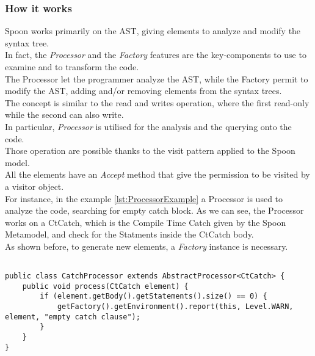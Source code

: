 \subsubsection{How it works}\label{subsec:howSpoon}
Spoon works primarily on the AST, giving elements to analyze and modify the syntax tree.\\
In fact, the \emph{Processor} and the \emph{Factory} features are the key-components to use to examine and to transform the code.\\
The Processor let the programmer analyze the AST, while the Factory permit to modify the AST, adding and/or removing elements from the syntax trees.\\
The concept is similar to the read and writes operation, where the first read-only while the second can also write.\\
In particular, \emph{Processor} is utilised for the analysis and the querying onto the code.\\
Those operation are possible thanks to the visit pattern applied to the Spoon model.\\
All the elements have an \emph{Accept} method that give the permission to be visited by a visitor object.\\
For instance, in the example \ref{lst:ProcessorExample} a Processor is used to analyze the code, searching for empty catch block.
As we can see, the Processor works on a CtCatch, which is the Compile Time Catch given by the Spoon Metamodel, and check for the Statments inside the CtCatch body. \\
As shown before, to generate new elements, a \emph{Factory} instance is necessary.\\
\begin{lstlisting}[caption={Processor example taken from \href{http://spoon.gforge.inria.fr/processor.html}{Spoon documentation}},label={lst:ProcessorExample}]% Start your code-block

public class CatchProcessor extends AbstractProcessor<CtCatch> {
	public void process(CtCatch element) {
		if (element.getBody().getStatements().size() == 0) {
			getFactory().getEnvironment().report(this, Level.WARN, element, "empty catch clause");
		}
	}
}
\end{lstlisting}

